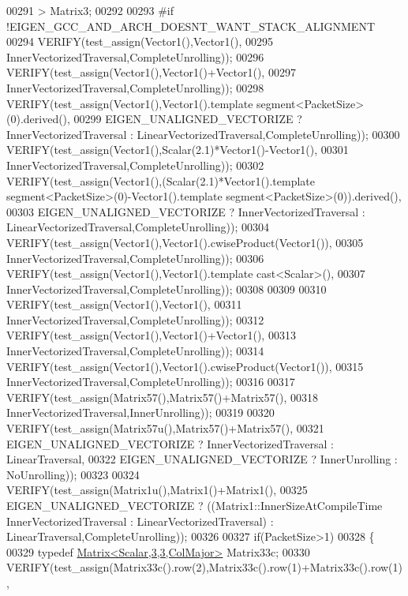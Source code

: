 \begin{DoxyCode}
00291       > Matrix3;
00292     
00293 \textcolor{preprocessor}{    #if !EIGEN\_GCC\_AND\_ARCH\_DOESNT\_WANT\_STACK\_ALIGNMENT}
00294     VERIFY(test\_assign(Vector1(),Vector1(),
00295       InnerVectorizedTraversal,CompleteUnrolling));
00296     VERIFY(test\_assign(Vector1(),Vector1()+Vector1(),
00297       InnerVectorizedTraversal,CompleteUnrolling));
00298     VERIFY(test\_assign(Vector1(),Vector1().\textcolor{keyword}{template} segment<PacketSize>(0).derived(),
00299       EIGEN\_UNALIGNED\_VECTORIZE ? InnerVectorizedTraversal : LinearVectorizedTraversal,CompleteUnrolling));
00300     VERIFY(test\_assign(Vector1(),Scalar(2.1)*Vector1()-Vector1(),
00301       InnerVectorizedTraversal,CompleteUnrolling));
00302     VERIFY(test\_assign(Vector1(),(Scalar(2.1)*Vector1().\textcolor{keyword}{template} segment<PacketSize>(0)-Vector1().\textcolor{keyword}{template} 
      segment<PacketSize>(0)).derived(),
00303       EIGEN\_UNALIGNED\_VECTORIZE ? InnerVectorizedTraversal : LinearVectorizedTraversal,CompleteUnrolling));
00304     VERIFY(test\_assign(Vector1(),Vector1().cwiseProduct(Vector1()),
00305       InnerVectorizedTraversal,CompleteUnrolling));
00306     VERIFY(test\_assign(Vector1(),Vector1().\textcolor{keyword}{template} cast<Scalar>(),
00307       InnerVectorizedTraversal,CompleteUnrolling));
00308 
00309 
00310     VERIFY(test\_assign(Vector1(),Vector1(),
00311       InnerVectorizedTraversal,CompleteUnrolling));
00312     VERIFY(test\_assign(Vector1(),Vector1()+Vector1(),
00313       InnerVectorizedTraversal,CompleteUnrolling));
00314     VERIFY(test\_assign(Vector1(),Vector1().cwiseProduct(Vector1()),
00315       InnerVectorizedTraversal,CompleteUnrolling));
00316 
00317     VERIFY(test\_assign(Matrix57(),Matrix57()+Matrix57(),
00318       InnerVectorizedTraversal,InnerUnrolling));
00319 
00320     VERIFY(test\_assign(Matrix57u(),Matrix57()+Matrix57(),
00321       EIGEN\_UNALIGNED\_VECTORIZE ? InnerVectorizedTraversal : LinearTraversal,
00322       EIGEN\_UNALIGNED\_VECTORIZE ? InnerUnrolling : NoUnrolling));
00323 
00324     VERIFY(test\_assign(Matrix1u(),Matrix1()+Matrix1(),
00325       EIGEN\_UNALIGNED\_VECTORIZE ? ((Matrix1::InnerSizeAtCompileTime %
      InnerVectorizedTraversal : LinearVectorizedTraversal) : LinearTraversal,CompleteUnrolling));
00326         
00327     \textcolor{keywordflow}{if}(PacketSize>1)
00328     \{
00329       \textcolor{keyword}{typedef} \hyperlink{group___core___module_class_eigen_1_1_matrix}{Matrix<Scalar,3,3,ColMajor>} Matrix33c;
00330       VERIFY(test\_assign(Matrix33c().row(2),Matrix33c().row(1)+Matrix33c().row(1),

\end{DoxyCode}
